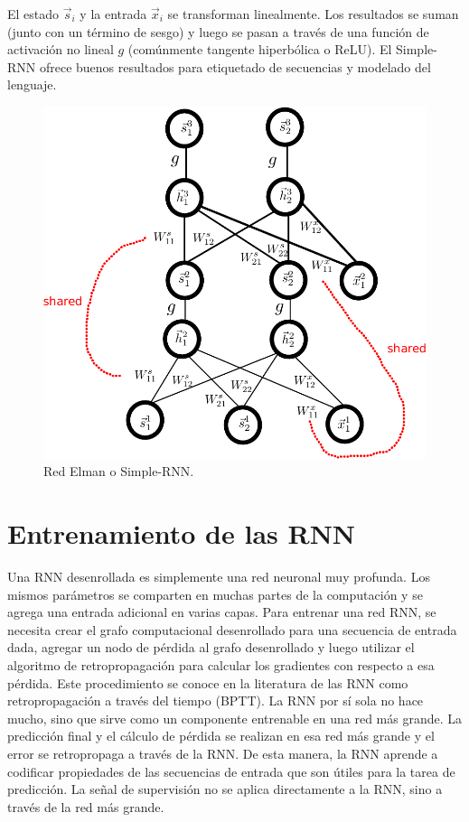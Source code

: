 El estado $\vec{s}_i$ y la entrada $\vec{x}_i$ se transforman linealmente. Los resultados se suman (junto con un término de sesgo) y luego se pasan a través de una función de activación no lineal $g$ (comúnmente tangente hiperbólica o ReLU). El Simple-RNN ofrece buenos resultados para etiquetado de secuencias y modelado del lenguaje.

\begin{figure}[h]
  \centering
  \includegraphics[scale=0.55]{pics/elman.pdf}
  \caption{Red Elman o Simple-RNN.}
\end{figure}

\section{Entrenamiento de las RNN}

Una RNN desenrollada es simplemente una red neuronal muy profunda. Los mismos parámetros se comparten en muchas partes de la computación y se agrega una entrada adicional en varias capas. Para entrenar una red RNN, se necesita crear el grafo computacional desenrollado para una secuencia de entrada dada, agregar un nodo de pérdida al grafo desenrollado y luego utilizar el algoritmo de retropropagación para calcular los gradientes con respecto a esa pérdida. Este procedimiento se conoce en la literatura de las RNN como retropropagación a través del tiempo (BPTT). La RNN por sí sola no hace mucho, sino que sirve como un componente entrenable en una red más grande. La predicción final y el cálculo de pérdida se realizan en esa red más grande y el error se retropropaga a través de la RNN. De esta manera, la RNN aprende a codificar propiedades de las secuencias de entrada que son útiles para la tarea de predicción. La señal de supervisión no se aplica directamente a la RNN, sino a través de la red más grande.

